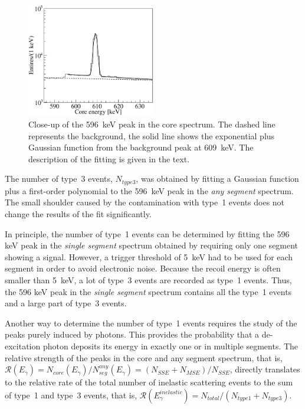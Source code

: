 \begin{figure}[tbhp]
\centering
\includegraphics[width=0.5\textwidth]{fit596}
\caption{Close-up of the 596~keV peak in the core spectrum. The dashed
line represents the background, the solid line shows the exponential
plus Gaussian function from the background peak at 609~keV. The
description of the fitting is given in the text.}
\label{fig:neu:f596}
\end{figure}

The number of type~3 events, $N_{type3}$, was obtained by fitting a
Gaussian function plus a first-order polynomial to the 596~keV peak in
the \emph{any segment} spectrum. The small shoulder caused by the
contamination with type~1 events does not change the results of the
fit significantly.

In principle, the number of type~1 events can be determined by fitting
the 596 keV peak in the \emph{single segment} spectrum obtained by
requiring only one segment showing a signal. However, a trigger
threshold of 5~keV had to be used for each segment in order to avoid
electronic noise. Because the recoil energy is often smaller than
5~keV, a lot of type~3 events are recorded as type~1 events. Thus, the
596 keV peak in the \emph{single segment} spectrum contains all the
type~1 events and a large part of type~3 events.

Another way to determine the number of type~1 events requires the
study of the peaks purely induced by photons. This provides the
probability that a de-excitation photon deposits its energy in exactly
one or in multiple segments. The relative strength of the peaks in the
core and any segment spectrum, that is, $\mathcal{R}(E_{\gamma}) =
N_{core}(E_{\gamma}) / N^{any}_{seg}(E_{\gamma}) = (N_{SSE} + N_{MSE})
/ N_{SSE}$, directly translates to the relative rate of the total
number of inelastic scattering events to the sum of type~1 and type~3
events, that is, $\mathcal{R}(E_{\gamma}^{inelastic}) = N_{total} /
(N_{type1} + N_{type3})$.

